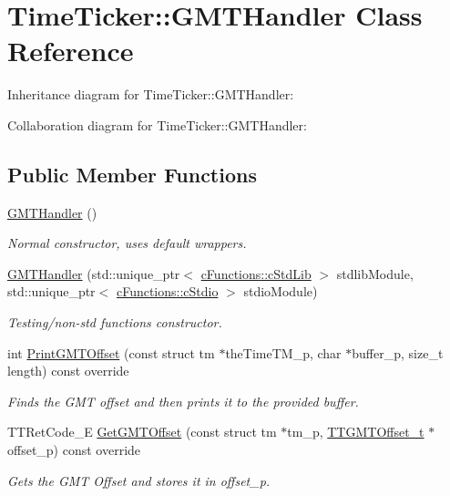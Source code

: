 \hypertarget{classTimeTicker_1_1GMTHandler}{}\section{Time\+Ticker\+::G\+M\+T\+Handler Class Reference}
\label{classTimeTicker_1_1GMTHandler}


Inheritance diagram for Time\+Ticker\+::G\+M\+T\+Handler\+:


Collaboration diagram for Time\+Ticker\+::G\+M\+T\+Handler\+:
\subsection*{Public Member Functions}
\begin{DoxyCompactItemize}
\item 
\mbox{\label{classTimeTicker_1_1GMTHandler_a3e6117fb95d4b718fd675c7adbf0f461}} 
\mbox{\hyperlink{classTimeTicker_1_1GMTHandler_a3e6117fb95d4b718fd675c7adbf0f461}{G\+M\+T\+Handler}} ()
\begin{DoxyCompactList}\small\item\em Normal constructor, uses default wrappers. \end{DoxyCompactList}\item 
\mbox{\hyperlink{classTimeTicker_1_1GMTHandler_a6deaf65737b34b1ed1c12e4c7ea33f4b}{G\+M\+T\+Handler}} (std\+::unique\+\_\+ptr$<$ \mbox{\hyperlink{classcFunctions_1_1cStdLib}{c\+Functions\+::c\+Std\+Lib}} $>$ stdlib\+Module, std\+::unique\+\_\+ptr$<$ \mbox{\hyperlink{classcFunctions_1_1cStdio}{c\+Functions\+::c\+Stdio}} $>$ stdio\+Module)
\begin{DoxyCompactList}\small\item\em Testing/non-\/std functions constructor. \end{DoxyCompactList}\item 
int \mbox{\hyperlink{classTimeTicker_1_1GMTHandler_ae47cdc7af3fcd0b28aee668e35b8f696}{Print\+G\+M\+T\+Offset}} (const struct tm $\ast$the\+Time\+T\+M\+\_\+p, char $\ast$buffer\+\_\+p, size\+\_\+t length) const override
\begin{DoxyCompactList}\small\item\em Finds the G\+MT offset and then prints it to the provided buffer. \end{DoxyCompactList}\item 
T\+T\+Ret\+Code\+\_\+E \mbox{\hyperlink{classTimeTicker_1_1GMTHandler_ad5732f5089f4fb8df8720995cdc930d7}{Get\+G\+M\+T\+Offset}} (const struct tm $\ast$tm\+\_\+p, \mbox{\hyperlink{structTTGMTOffset}{T\+T\+G\+M\+T\+Offset\+\_\+t}} $\ast$offset\+\_\+p) const override
\begin{DoxyCompactList}\small\item\em Gets the G\+MT Offset and stores it in offset\+\_\+p. \end{DoxyCompactList}\end{DoxyCompactItemize}


